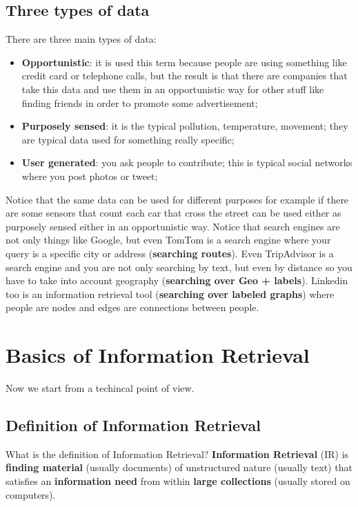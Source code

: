 \subsection{Three types of data}
There are three main types of data:
\begin{itemize}
    \item \textbf{Opportunistic}: it is used this term because people are using something like credit card or telephone calls, but the result is that there are companies that take this data and use them in an opportunistic way for other stuff like finding friends in order to promote some advertisement;
    \item \textbf{Purposely sensed}: it is the typical pollution, temperature, movement; they are typical data used for something really specific;
    \item \textbf{User generated}: you ask people to contribute; this is typical social networks where you post photos or tweet;
\end{itemize}
Notice that the same data can be used for different purposes for example if there are some sensors that count each car that cross the street can be used either as purposely sensed either in an opportunistic way.\newline
Notice that search engines are not only things like Google, but even TomTom is a search engine where your query is a specific city or address (\textbf{searching routes}).
Even TripAdvisor is a search engine and you are not only searching by text, but even by distance so you have to take into account geography (\textbf{searching over Geo + labels}).\newline
Linkedin too is an information retrieval tool (\textbf{searching over labeled graphs}) where people are nodes and edges are connections between people.\newline
\newline
\section{Basics of Information Retrieval}
Now we start from a techincal point of view.
\subsection{Definition of Information Retrieval}
What is the definition of Information Retrieval? \textbf{Information Retrieval} (IR) is \textbf{finding material} (usually documents) of unstructured nature (usually text) that satisfies an \textbf{information need} from within \textbf{large collections} (usually stored on computers).
